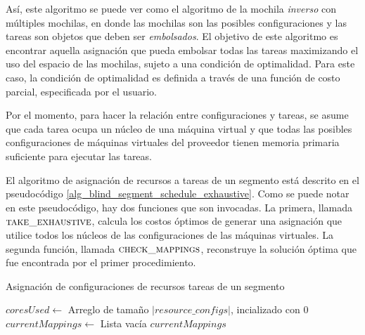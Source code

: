 Así, este algoritmo se puede ver como el algoritmo de la mochila \emph{inverso} con múltiples mochilas, en donde las mochilas son las posibles configuraciones y las tareas son objetos que deben ser \emph{embolsados}. El objetivo de este algoritmo es encontrar aquella asignación que pueda embolsar todas las tareas maximizando el uso del espacio de las mochilas, sujeto a una condición de optimalidad. Para este caso, la condición de optimalidad es definida a trav\'es de una funci\'on de costo parcial, especificada por el usuario. 

Por el momento, para hacer la relaci\'on entre configuraciones y tareas, se asume que cada tarea ocupa un núcleo de una máquina virtual y que todas las posibles configuraciones de máquinas virtuales del proveedor tienen memoria primaria suficiente para ejecutar las tareas.

El algoritmo de asignación de recursos a tareas de un segmento está descrito en el pseudocódigo \ref{alg_blind_segment_schedule_exhaustive}. Como se puede notar en este pseudocódigo, hay dos funciones que son invocadas. La primera, llamada $\Call{take\_exhaustive}{}$, calcula los costos óptimos de generar una asignación que utilice todos los núcleos de las configuraciones de las máquinas virtuales. La segunda funci\'on, llamada $\Call{check\_mappings}{}$, reconstruye la soluci\'on \'optima que fue encontrada por el primer procedimiento.

\begin{algorithm}
\caption{Asignación de configuraciones de recursos tareas de un segmento}
\label{alg_blind_segment_schedule_exhaustive}
\begin{algorithmic}[1]

	\State $coresUsed \gets$ Arreglo de tamaño $|resource\_configs|$, incializado con 0
	\State $currentMappings \gets$ Lista vacía	
	\State {}
	\State \Return $currentMappings$
\EndProcedure
\end{algorithmic}
\end{algorithm}



